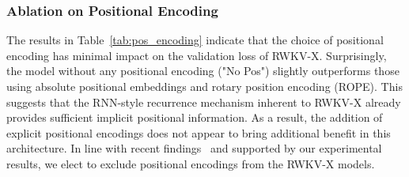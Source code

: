 \subsubsection{Ablation on Positional Encoding}

The results in Table~\ref{tab:pos_encoding} indicate that the choice of positional encoding has minimal impact on the validation loss of RWKV-X.
Surprisingly, the model without any positional encoding ("No Pos") slightly outperforms those using absolute positional embeddings and rotary position encoding (ROPE).
This suggests that the RNN-style recurrence mechanism inherent to RWKV-X already provides sufficient implicit positional information.
As a result, the addition of explicit positional encodings does not appear to bring additional benefit in this architecture.
In line with recent findings~\cite{Lieber2024JambaAH} and supported by our experimental results, we elect to exclude positional encodings from the RWKV-X models.

\begin{table}[htbp]
    \centering
    \caption{
    Validation loss of RWKV-X under different positional encoding schemes. 
    “No Pos” indicates no positional encoding; “Abs Pos” uses absolute positional encoding; 
    “ROPE” applies rotary position encoding.
    }
    \label{tab:pos_encoding}
\end{table}

